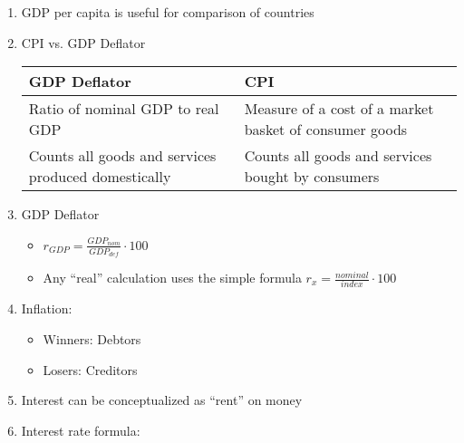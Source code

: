 \documentclass[12pt]{article}
\begin{document}
\begin{enumerate}
\begin{enumerate}
\begin{itemize}
        \end{itemize}

      \item GDP per capita is useful for comparison of countries

      \item CPI vs. GDP Deflator

        \begin{center}
          \begin{tabular}{|p{}|p{}|}
            \hline
            GDP Deflator & CPI\\
            \hline
            Ratio of nominal GDP to real GDP & Measure of a cost of a market basket of consumer goods\\
            \hline
            Counts all goods and services produced domestically & Counts all goods and services bought by consumers\\
            \hline
          \end{tabular}
        \end{center}

      \item GDP Deflator

        \begin{itemize}

          \item $r_{GDP} = \frac{GDP_{nom}}{GDP_{def}}\cdot 100$

          \item Any “real” calculation uses the simple formula $r_{x} = \frac{nominal}{index}\cdot 100$

        \end{itemize}

      \item Inflation:

        \begin{itemize}

          \item Winners: Debtors

          \item Losers: Creditors

        \end{itemize}

      \item Interest can be conceptualized as “rent” on money

      \item Interest rate formula:

        \begin{itemize}


\end{itemize}
\end{enumerate}
\end{enumerate}
\end{document}
